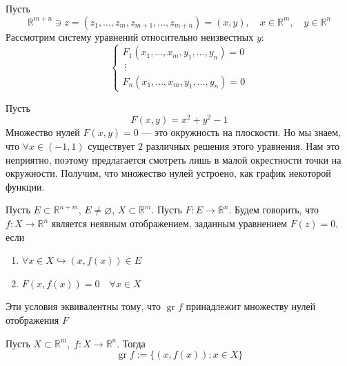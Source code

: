 \documentclass[11pt]{article}
\DeclareMathOperator{\gr}{gr}
\begin{document}
Пусть 
\[\mathbb{R}^{m + n} \ni z = (z_1, \dots, z_m, z_{m + 1}, \dots, z_{m + n}) = (x, y), \quad x \in \mathbb{R}^m, \quad y \in \mathbb{R}^n\]
Рассмотрим систему уравнений относительно неизвестных $y$:
\begin{equation*}
    \begin{cases}
        F_1(x_1, \dots, x_m, y_1, \dots, y_n) = 0 \\
        \ \vdots \\
        F_n(x_1, \dots, x_m, y_1, \dots, y_n) = 0
    \end{cases}
\end{equation*}

\begin{example}
    Пусть 
    \[F(x, y) = x^2 + y^2 - 1\] 
    Множество нулей $F(x, y) = 0$ --- это окружность на плоскости.
    Но мы знаем, что $\forall x \in (-1, 1)$ существует $2$ различных решения  этого уравнения. 
    Нам это неприятно, поэтому предлагается смотреть лишь в малой окрестности точки на 
    окружности. Получим, что множество нулей устроено, как график некоторой функции.
\end{example}

\begin{definition}
    Пусть $E \subset \mathbb{R}^{n + m}$, $E \neq \varnothing$, $X \subset \mathbb{R}^m$. 
    Пусть $F \colon E \to \mathbb{R}^n$. Будем говорить, что $f \colon X \to \mathbb{R}^n$ является неявным отображением, заданным уравнением 
    $F(z) = 0$, если 
    \begin{enumerate}
        \item $\forall x \in X \hookrightarrow (x, f(x)) \in E$
        \item $F(x, f(x)) = 0 \quad \forall x \in X$
    \end{enumerate}
    Эти условия эквивалентны тому, что $\gr f$ принадлежит множеству нулей отображения $F$
\end{definition}

\begin{definition}
    Пусть $X \subset \mathbb{R}^m, \; f \colon X \to \mathbb{R}^n$. Тогда
    \[\gr f := \{(x, f(x)): x \in X\}\]
\end{definition}
\end{document}
